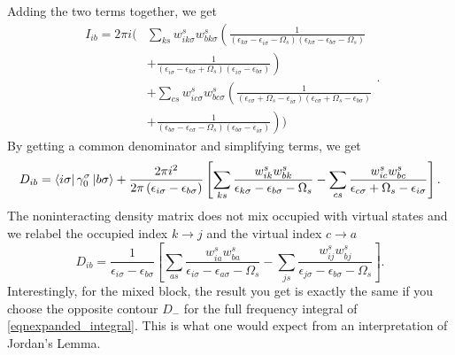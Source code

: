 \documentclass[12pt]{caltech_thesis}
\begin{document}
Adding the two terms together, we get
\begin{equation}
\begin{aligned}
I_{ib} = 2\pi i \Bigg( & \sum_{ks} w_{i k \sigma}^s w_{b k \sigma}^s \left( \frac{1}{(\epsilon_{k \sigma} -\epsilon_{i \sigma}-\Omega_s)(\epsilon_{k \sigma} -\epsilon_{b \sigma}-\Omega_s)} \right. \\
& \left. + \frac{1}{(\epsilon_{i \sigma} -\epsilon_{k \sigma}+\Omega_s)(\epsilon_{i \sigma} -\epsilon_{b \sigma})} \right) \\
& + \sum_{cs} w_{i c \sigma}^s w_{b c \sigma}^s \left( \frac{1}{(\epsilon_{c \sigma} + \Omega_s -\epsilon_{i \sigma})(\epsilon_{c \sigma} + \Omega_s -\epsilon_{b \sigma})} \right. \\
& \left. + \frac{1}{(\epsilon_{b \sigma} -\epsilon_{c \sigma}-\Omega_s)(\epsilon_{b \sigma} -\epsilon_{i \sigma})} \right) \Bigg)
\end{aligned}
.
\end{equation}
By getting a common denominator and simplifying terms, we get
\begin{equation}
D_{ib} = \bra{i\sigma } \gamma _0^\sigma \ket{b\sigma } + \frac{2\pi i^2}{2\pi\left( \epsilon _{i\sigma } - \epsilon _{b\sigma } \right)} \left[ \sum_{ks} \frac{w_{ik}^s w_{bk}^s}{\epsilon _{k\sigma } - \epsilon _{b\sigma } - \Omega _s} - \sum_{cs} \frac{w_{ic}^s w_{bc}^s}{\epsilon _{c \sigma} + \Omega _s - \epsilon _{i\sigma}} \right].
\end{equation}
The noninteracting density matrix does not mix occupied with virtual states and we relabel the occupied index $k\rightarrow j$ and the virtual index $c\rightarrow a$
\begin{equation}
D_{ib} = \frac{1}{\epsilon _{i\sigma } - \epsilon _{b\sigma }} \left[ \sum_{as} \frac{w_{ia}^s w_{ba}^s}{\epsilon _{i\sigma } - \epsilon _{a\sigma } - \Omega _s} - \sum_{js} \frac{w_{ij}^s w_{bj}^s}{\epsilon _{j\sigma } - \epsilon _{b\sigma } - \Omega _s} \right].
\end{equation}
Interestingly, for the mixed block, the result you get is exactly the same if you choose the opposite contour $D_-$ for the full frequency integral of \ref{eqnexpanded_integral}. This is what one would expect from an interpretation of Jordan's Lemma. 




\printindex


\end{document}
